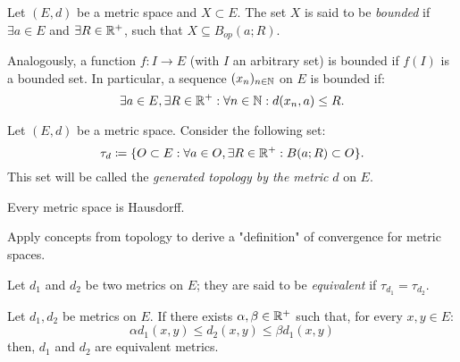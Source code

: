 \begin{definition}
	Let $(E, d)$ be a metric space and $X \subset E$. The set $X$ is said to be \emph{bounded} if $\exists a \in E$ and $\exists R \in \mathbb{R}^+$, such that $X \subseteq B_{op}(a;R)$. \par
	Analogously, a function $f : I \to E$ (with $I$ an arbitrary set) is bounded if $f(I)$ is a bounded set. In particular, a sequence $(x_n)_{n \in \mathbb{N}}$ on $E$ is bounded if:
	\begin{equation*}
		\exists a \in E, \exists R \in \mathbb{R}^+ : \forall n \in \mathbb{N} : d(x_n, a) \leq R .
	\end{equation*}
\end{definition}


\begin{definition}
	Let $(E,d)$ be a metric space. Consider the following set:
	\begin{equation*}
		\tau_d \coloneqq \{O \subset E : \forall a \in O, \exists R \in \mathbb{R}^+ : B(a;R) \subset O \}.
	\end{equation*}
	This set will be called the \emph{generated topology by the metric} $d$ on $E$.
\end{definition}

\begin{theorem}
	Every metric space is Hausdorff.	
\end{theorem}

Apply concepts from topology to derive a "definition" of convergence for metric spaces.

\begin{definition}
	Let $d_1$ and $d_2$ be two metrics on $E$; they are said to be \emph{equivalent} if $\tau_{d_1} = \tau_{d_2}$.
\end{definition}

\begin{proposition}
	Let $d_1, d_2$ be metrics on $E$.
	If there exists $\alpha, \beta \in \mathbb{R}^+$ such that, for every $x,y\in E$:
	\begin{equation*}
		\alpha d_1(x,y) \leq d_2(x,y) \leq \beta d_1(x,y)	
	\end{equation*}
	then, $d_1$ and $d_2$ are equivalent metrics.
\end{proposition}
